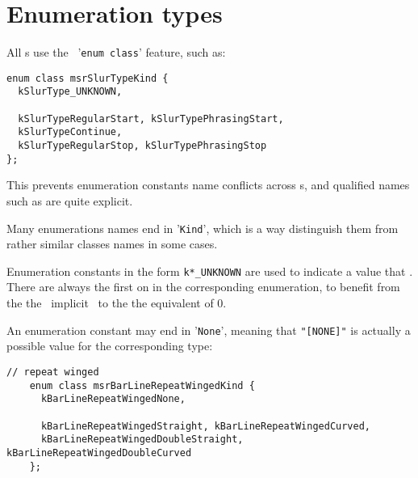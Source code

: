 \section{Enumeration types}

All \enumType s use the \CPlusplus\ '{\tt enum class}' feature, such as:

\begin{lstlisting}[language=CPlusPlus]
enum class msrSlurTypeKind {
  kSlurType_UNKNOWN,

  kSlurTypeRegularStart, kSlurTypePhrasingStart,
  kSlurTypeContinue,
  kSlurTypeRegularStop, kSlurTypePhrasingStop
};
\end{lstlisting}

This prevents enumeration constants name conflicts across \enumType s, and qualified names such as  are quite explicit.

Many enumerations names end in '{\tt Kind}', which is a way distinguish them from rather similar classes names in some cases.

Enumeration constants in the form {\tt k*_UNKNOWN} are used to indicate a value that . There are always the first on in the corresponding enumeration, to benefit from the the \CPlusplus\ implicit \initialization\  to the the equivalent of 0.

An enumeration constant may end in '{\tt None}', meaning that {\tt "[NONE]"} is actually a possible value for the corresponding type:
\begin{lstlisting}[language=CPlusPlus]
    // repeat winged
    enum class msrBarLineRepeatWingedKind {
      kBarLineRepeatWingedNone,

      kBarLineRepeatWingedStraight, kBarLineRepeatWingedCurved,
      kBarLineRepeatWingedDoubleStraight, kBarLineRepeatWingedDoubleCurved
    };
\end{lstlisting}

